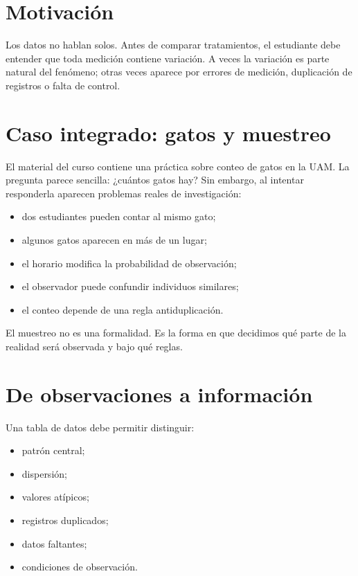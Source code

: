
\section{Motivación}

Los datos no hablan solos. Antes de comparar tratamientos, el estudiante debe entender que toda medición contiene variación. A veces la variación es parte natural del fenómeno; otras veces aparece por errores de medición, duplicación de registros o falta de control.

\section{Caso integrado: gatos y muestreo}

El material del curso contiene una práctica sobre conteo de gatos en la UAM. La pregunta parece sencilla: ¿cuántos gatos hay? Sin embargo, al intentar responderla aparecen problemas reales de investigación:

\begin{itemize}
  \item dos estudiantes pueden contar al mismo gato;
  \item algunos gatos aparecen en más de un lugar;
  \item el horario modifica la probabilidad de observación;
  \item el observador puede confundir individuos similares;
  \item el conteo depende de una regla antiduplicación.
\end{itemize}

\begin{idea}
El muestreo no es una formalidad. Es la forma en que decidimos qué parte de la realidad será observada y bajo qué reglas.
\end{idea}

\section{De observaciones a información}

Una tabla de datos debe permitir distinguir:

\begin{itemize}
  \item patrón central;
  \item dispersión;
  \item valores atípicos;
  \item registros duplicados;
  \item datos faltantes;
  \item condiciones de observación.
\end{itemize}

